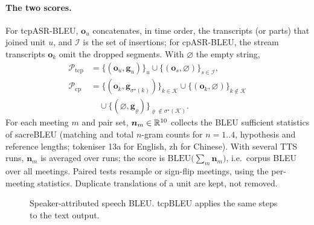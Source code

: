 \paragraph{The two scores.} For tcpASR-BLEU, $\bm{o}_u$ concatenates, in time order, the transcripts (or parts) that joined
unit $u$, and $\mathcal{I}$ is the set of insertions; for cpASR-BLEU, the stream transcripts $\bm{o}_k$ omit the dropped
segments. With $\varnothing$ the empty string,
\begin{equation}
\begin{aligned}
\mathcal{P}_{\mathrm{tcp}}&=\{(\bm{o}_u,\bm{g}_u)\}_{u}\cup\{(\bm{o}_s,\varnothing)\}_{s\in\mathcal{I}},\\
\mathcal{P}_{\mathrm{cp}}&=\{(\bm{o}_k,\bm{g}_{\sigma^\star(k)})\}_{k\in\mathcal{K}}\cup\{(\bm{o}_k,\varnothing)\}_{k\notin\mathcal{K}}\\
&\quad\cup\{(\varnothing,\bm{g}_\varrho)\}_{\varrho\notin\sigma^\star(\mathcal{K})}.
\end{aligned}
\label{eq:pairs}
\end{equation}
For each meeting $m$ and pair set, $\bm{n}_m\in\mathbb{R}^{10}$ collects the BLEU sufficient statistics of sacreBLEU (matching
and total $n$-gram counts for $n=1..4$, hypothesis and reference lengths; tokeniser 13a for English, zh for Chinese).
With several TTS runs, $\bm{n}_m$ is averaged over runs; the score is $\mathrm{BLEU}\big(\sum_m\bm{n}_m\big)$, i.e.\ corpus
BLEU over all meetings. Paired tests resample or sign-flip meetings, using the per-meeting statistics. Duplicate
translations of a unit are kept, not removed.

\begin{figure}[h]
\small
{}
\caption{Speaker-attributed speech BLEU. tcpBLEU applies the same steps to the text output.}
\label{alg:metrics}
\end{figure}

